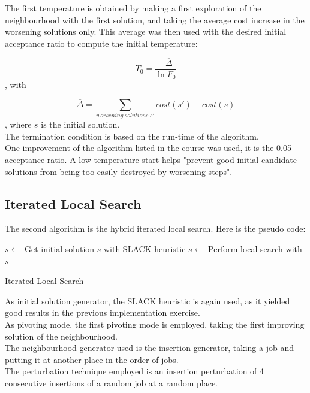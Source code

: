 The first temperature is obtained by making a first exploration of the neighbourhood with the first solution, and taking the average cost increase in the worsening solutions only. This average was then used with the desired initial acceptance ratio to compute the initial temperature:

$$T_0 = \frac{-\overline{\Delta}}{\ln{F_0}}$$, with

$$\overline{\Delta} = \sum_{worsening ~solutions ~s'}{cost(s') - cost(s)}$$, where $s$ is the initial solution.\\

The termination condition is based on the run-time of the algorithm.\\

One improvement of the algorithm listed in the course was used, it is the 0.05 acceptance ratio. A low temperature start helps "prevent good initial candidate solutions from being too easily destroyed by worsening steps".

\subsection{Iterated Local Search}

The second algorithm is the hybrid iterated local search. Here is the pseudo code:

\begin{algorithm}[H]
 $s \leftarrow$ Get initial solution $s$ with SLACK heuristic\;
 $s \leftarrow$ Perform local search with $s$\;
 \caption{Iterated Local Search}
\end{algorithm}

As initial solution generator, the SLACK heuristic is again used, as it yielded good results in the previous implementation exercise.\\

As pivoting mode, the first pivoting mode is employed, taking the first improving solution of the neighbourhood.\\

The neighbourhood generator used is the insertion generator, taking a job and putting it at another place in the order of jobs.\\

The perturbation technique employed is an insertion perturbation of 4 consecutive insertions of a random job at a random place.\\

